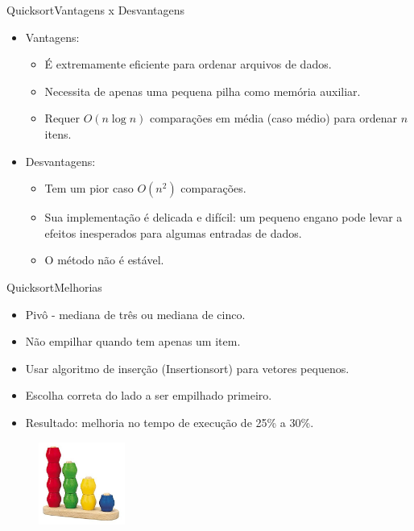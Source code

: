 \documentclass[aspectratio=169]{beamer}
\begin{document}
\begin{frame}{Quicksort}{Vantagens x Desvantagens}
\begin{itemize}
\item Vantagens:
\begin{itemize}
\item É extremamente eficiente para ordenar arquivos de dados.
\item Necessita de apenas uma pequena pilha como memória auxiliar.
\item Requer $O(n \log n)$ comparações em média (caso médio) para ordenar $n$ itens.
\end{itemize}
\item Desvantagens:
\begin{itemize}
\item Tem um pior caso $O(n^2)$ comparações.
\item Sua implementação é delicada e difícil: um pequeno engano pode levar a efeitos inesperados para algumas entradas de dados.
\item O método não é estável.
\end{itemize}
\end{itemize}
\end{frame}


\begin{frame}{Quicksort}{Melhorias}
\begin{itemize}
\item Pivô - mediana de três ou mediana de cinco.
\item Não empilhar quando tem apenas um item.
\item Usar algoritmo de inserção (Insertionsort) para vetores pequenos.
\item Escolha correta do lado a ser empilhado primeiro.
\item Resultado: melhoria no tempo de execução de 25\% a 30\%.
\end{itemize}
\end{frame}

\begin{frame}
\titlepage %

\begin{figure}[!h]
  \centering
  \includegraphics[width=80pt]{imgs/introducao.jpg}
  \label{fig_introducao}
\end{figure}
\end{frame}

%
%
\end{document}
